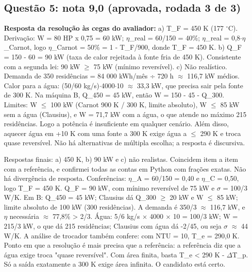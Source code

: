 \documentclass{article}%
\begin{document}
\subsection*{Questão 5: nota 9,0 (aprovada, rodada 3 de 3)}%
\textbf{Resposta da resolução às cegas do avaliador:} a) T\_F = 450 K (177 $^\circ$C). Derivação: W = 80 HP x 0,75 = 60 kW; $\eta$\_real = 60/150 = 40\%; $\eta$\_real = 0,8$\cdot$$\eta$\_Carnot, logo $\eta$\_Carnot = 50\% = 1 {-} T\_F/900, donde T\_F = 450 K.\newline%
\newline%
b) Q\_F = 150 {-} 60 = 90 kW (taxa de calor rejeitada à fonte fria de 450 K). Consistente com a segunda lei: 90 kW $\geq$ 75 kW (mínimo reversível).\newline%
\newline%
c) Não realístico. Demanda de 350 residências = 84 000 kWh/mês ÷ 720 h $\approx$ 116,7 kW médios. Calor para a água: (50/60 kg/s)$\cdot$4000$\cdot$10 $\approx$ 33,3 kW, que precisa sair pela fonte de 300 K. Na máquina B, Q\_450 = 45 kW, então W = 150 {-} 45 {-} Q\_300. Limites: W $\leq$ 100 kW (Carnot 900 K / 300 K, limite absoluto), W $\leq$ 85 kW sem a água (Clausius), e W = 71,7 kW com a água, o que atende no máximo 215 residências. Logo a potência é insuficiente em qualquer cenário. Além disso, aquecer água em +10 K com uma fonte a 300 K exige água a $\leq$ 290 K e troca quase reversível. Não há alternativas de múltipla escolha; a resposta é discursiva.\par %
Respostas finais: a) 450 K, b) 90 kW e c) não realistas. Coincidem item a item com a referência, e confirmei todas as contas em Python com frações exatas. Não há divergência de resposta.\newline%
\newline%
Conferências: $\eta$\_A = 60/150 = 0,40 e $\eta$\_C = 0,50, logo T\_F = 450 K. Q\_F = 90 kW, com mínimo reversível de 75 kW e $\sigma$ = 100/3 W/K. Em B: Q\_450 = 45 kW; Clausius dá Q\_300 $\geq$ 20 kW e W $\leq$ 85 kW; limite absoluto de 100 kW (300 residências). A demanda é 350/3 $\approx$ 116,7 kW, e $\eta$ necessária $\approx$ 77,8\% > 2/3. Água: 5/6 kg/s $\times$ 4000 $\times$ 10 = 100/3 kW; W = 215/3 kW, o que dá 215 residências; Clausius com água dá -2/45, ou seja $\sigma$ $\approx$ 44 W/K. A análise de trocador também confere: com NTU = 10, T\_e = 290,0 K.\newline%
\newline%
Ponto em que a resolução é mais precisa que a referência: a referência diz que a água exige troca "quase reversível". Com área finita, basta T\_e < 290 K - $\Delta$T\_p. Só a saída exatamente a 300 K exige área infinita. O candidato está certo.\newline%
$$
\end{document}
